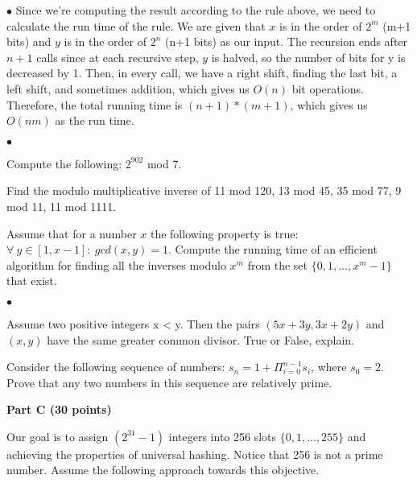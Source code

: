 \documentclass{article}
\newenvironment{myitem}{\begin{list}{$\bullet$}
{\setlength{\itemsep}{-0pt}
\setlength{\topsep}{0pt}
\setlength{\labelwidth}{0pt}
\setlength{\leftmargin}{10pt}
\setlength{\parsep}{-0pt}
\setlength{\itemsep}{0pt}
\setlength{\partopsep}{0pt}}}%
{\end{list}}
\begin{document}
\begin{myitem}
Since we're computing the result according to the rule above, we need to calculate the run time of the rule. We are given that $x$ is in the order of $2^m$ (m+1 bits) and $y$ is in the order of $2^n$ (n+1 bits) as our input. The recursion ends after $n+1$ calls since at each recursive step, $y$ is halved, so the number of bits for y is decreased by 1. Then, in every call, we have a right shift, finding the last bit, a left shift, and sometimes addition, which gives us $O(n)$ bit operations. Therefore, the total running time is $(n+1)*(m+1)$, which gives us $O(nm)$ as the run time.\\
\end{myitem}

\begin{myitem}
\item Compute the following: $2^{902}$ mod 7.\\
\item Find the modulo multiplicative inverse of 11 mod 120, 13 mod 45,
  35 mod 77, 9 mod 11, 11 mod 1111.\\
\item Assume that for a number $x$ the following property is true:
  $\forall\ y \in [1,x-1]:\ gcd(x,y) = 1$. Compute the running time of
  an efficient algorithm for finding all the inverses modulo $x^m$
  from the set $\{0, 1, \ldots, x^m-1\}$ that exist.\\
\end{myitem}

\begin{myitem}
\item Assume two positive integers x < y. Then the pairs
  $(5x+3y,3x+2y)$ and $(x,y)$ have the same greater common
  divisor. True or False, explain.\\

\item Consider the following sequence of numbers: $s_n = 1 +
  \Pi_{i=0}^{n-1} s_i$, where $s_0 = 2$. Prove that any two numbers in
  this sequence are relatively prime.\\
\end{myitem}

\begin{center}
{\bf Part C (30 points)}
\end{center}

 Our goal is to assign $(2^{31}-1)$ integers
into 256 slots $\{0,1, \dots, 255\}$ and achieving the properties of
universal hashing. Notice that 256 is not a prime number. Assume the
following approach towards this objective.\\
\end{document}
